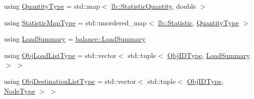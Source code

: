 \begin{DoxyCompactItemize}
\item 
using \hyperlink{structvt_1_1vrt_1_1collection_1_1lb_1_1_base_l_b_a864b2c437d81680577013741e265ef0d}{Quantity\+Type} = std\+::map$<$ \hyperlink{namespacevt_1_1vrt_1_1collection_1_1lb_a74989c7b4dd16fcc067e90a29cd1febe}{lb\+::\+Statistic\+Quantity}, double $>$
\item 
using \hyperlink{structvt_1_1vrt_1_1collection_1_1lb_1_1_base_l_b_acd9bdad961ac83c96b7a227de672f96c}{Statistic\+Map\+Type} = std\+::unordered\+\_\+map$<$ \hyperlink{namespacevt_1_1vrt_1_1collection_1_1lb_af0e20ef9afee77295053aa83bf1348b1}{lb\+::\+Statistic}, \hyperlink{structvt_1_1vrt_1_1collection_1_1lb_1_1_base_l_b_a864b2c437d81680577013741e265ef0d}{Quantity\+Type} $>$
\item 
using \hyperlink{structvt_1_1vrt_1_1collection_1_1lb_1_1_base_l_b_aa78583f362acc50fcca87d4ce3150151}{Load\+Summary} = \hyperlink{structvt_1_1vrt_1_1collection_1_1balance_1_1_load_summary}{balance\+::\+Load\+Summary}
\item 
using \hyperlink{structvt_1_1vrt_1_1collection_1_1lb_1_1_base_l_b_ae07370140db06e363398914895c5c728}{Obj\+Load\+List\+Type} = std\+::vector$<$ std\+::tuple$<$ \hyperlink{structvt_1_1vrt_1_1collection_1_1lb_1_1_base_l_b_a790b22acf448880599724749cdc4e9b3}{Obj\+I\+D\+Type}, \hyperlink{structvt_1_1vrt_1_1collection_1_1lb_1_1_base_l_b_aa78583f362acc50fcca87d4ce3150151}{Load\+Summary} $>$ $>$
\item 
using \hyperlink{structvt_1_1vrt_1_1collection_1_1lb_1_1_base_l_b_ad50ba1022c6beeb6e9187a8f1a3e16fe}{Obj\+Destination\+List\+Type} = std\+::vector$<$ std\+::tuple$<$ \hyperlink{structvt_1_1vrt_1_1collection_1_1lb_1_1_base_l_b_a790b22acf448880599724749cdc4e9b3}{Obj\+I\+D\+Type}, \hyperlink{namespacevt_a866da9d0efc19c0a1ce79e9e492f47e2}{Node\+Type} $>$ $>$
\end{DoxyCompactItemize}
